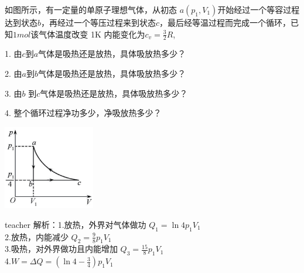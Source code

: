 \begin{example}
如图所示，有一定量的单原子理想气体，从初态 $a(p_1,V_1)$开始经过一个等容过程达到状态$ b$，再经过一个等压过程来到状态$c$，最后经等温过程而完成一个循环，已知$ 1\si{mol}$该气体温度改变 1K 内能变化为$c_v = \frac{3}{2}R$,


1. 由$ c $到$ a $气体是吸热还是放热，具体吸放热多少？ 
	
2. 由$ a $到$ b $气体是吸热还是放热，具体吸放热多少？ 

3. 由$ b$ 到$ c $气体是吸热还是放热，具体吸放热多少？ 

4. 整个循环过程净功多少，净吸放热多少？
	\begin{flushright}
		\includegraphics[width = 0.3\textwidth]{images/thermal-10.pdf} 
	\end{flushright}
	\begin{taggedblock}{teacher}
		\noindent
		解析：1.放热，外界对气体做功 $Q_1=\ln4p_1V_1$
		\\2.放热，内能减少 $Q_2=\frac{9}{8}p_1V_1$
		\\3.吸热，对外界做功且内能增加 $Q_3=\frac{15}{8}p_1V_1$
		\\4.$W=\Delta Q=(\ln4-\frac{3}{4})p_1V_1$
	\end{taggedblock}
\end{example}




